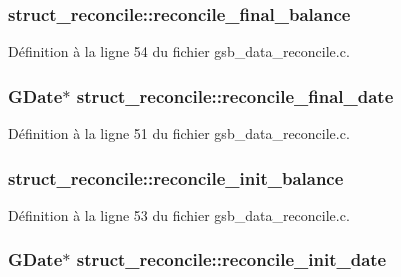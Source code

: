 \subsubsection[{reconcile\_\-final\_\-balance}]{ {\bf struct\_\-reconcile::reconcile\_\-final\_\-balance}}\label{structstruct__reconcile_a8cfb6b175aa170bf3054908a962de6f5}


Définition à la ligne 54 du fichier gsb\_\-data\_\-reconcile.c.

\subsubsection[{reconcile\_\-final\_\-date}]{\setlength{\rightskip}{0pt plus 5cm}GDate$\ast$ {\bf struct\_\-reconcile::reconcile\_\-final\_\-date}}\label{structstruct__reconcile_a2b7eb34dbe016f5a0d8fe5ce4ce41a50}


Définition à la ligne 51 du fichier gsb\_\-data\_\-reconcile.c.

\subsubsection[{reconcile\_\-init\_\-balance}]{ {\bf struct\_\-reconcile::reconcile\_\-init\_\-balance}}\label{structstruct__reconcile_a3e12737ee50162e9feca514e9e6a0a55}


Définition à la ligne 53 du fichier gsb\_\-data\_\-reconcile.c.

\subsubsection[{reconcile\_\-init\_\-date}]{\setlength{\rightskip}{0pt plus 5cm}GDate$\ast$ {\bf struct\_\-reconcile::reconcile\_\-init\_\-date}}\label{structstruct__reconcile_ab28801fb533be5d1944582b8ed849fee}


